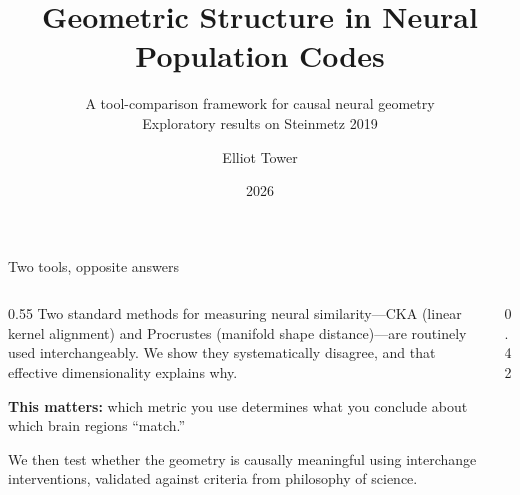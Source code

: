 \documentclass[aspectratio=169,11pt]{beamer}
\title{Geometric Structure in Neural Population Codes}
\subtitle{A tool-comparison framework for causal neural geometry\\{\small Exploratory results on Steinmetz 2019}}
\author{Elliot Tower}
\date{2026}
\institute{}
\begin{document}
\maketitle


\begin{frame}{Two tools, opposite answers}
\begin{columns}[T]
\begin{column}{0.55\textwidth}
Two standard methods for measuring neural similarity---CKA (linear kernel alignment) and Procrustes (manifold shape distance)---are routinely used interchangeably. We show they systematically disagree, and that effective dimensionality explains why.

\vspace{0.8em}
\textbf{This matters:} which metric you use determines what you conclude about which brain regions ``match.''

\vspace{0.8em}
We then test whether the geometry is causally meaningful using interchange interventions, validated against criteria from philosophy of science.
\end{column}
\begin{column}{0.42\textwidth}
\end{column}
\end{columns}
\end{frame}
\end{document}
